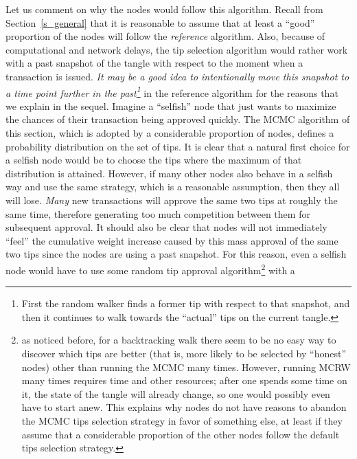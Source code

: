 \documentclass[12pt]{article}
\begin{document}
Let us comment on why 
 the nodes would follow this algorithm.
Recall from Section~\ref{s_general} that
it is reasonable to assume that at least a ``good'' proportion
of the nodes will follow the \emph{reference} algorithm.
Also, because of computational and network delays, the 
tip selection algorithm would rather work with a past snapshot
of the tangle with respect to the moment when a transaction
is issued. \emph{It may be a good idea to intentionally
move this snapshot to a time point further in the past\footnote{First
the random walker finds a former tip with respect to that snapshot,
and then it continues to walk towards the ``actual'' tips
on the current tangle.}} in the reference algorithm 
for the reasons that we explain in the sequel.
Imagine a ``selfish'' node that just wants to maximize 
the chances of their transaction being approved quickly.
The MCMC algorithm of this section, which is adopted by a
 considerable proportion of nodes, 
defines a probability
distribution on the set of tips. 
It is clear that a natural first choice for a selfish node would be
to choose the tips where the maximum of that distribution 
is attained. However, if many other nodes also behave
in a selfish way 
 and use the same strategy, which is a reasonable assumption, 
 then they all 
will lose. \emph{Many} new transactions will approve 
the same two tips at roughly the same time, therefore
generating too much competition between them for subsequent approval.
It should also be clear that nodes will not immediately ``feel'' the cumulative 
weight increase caused by this mass approval of the same two tips since 
the nodes are using a past snapshot.
 For this reason, even a selfish node would have 
to use some random tip approval algorithm\footnote{as noticed
before, for a backtracking walk there 
seem to be no easy way to discover which tips are 
 better (that is, more likely to be selected
by ``honest'' nodes) other than running the MCMC many times.
However, running MCRW many times requires time and other
resources; after one spends some time on it, 
the state of the tangle will already change, 
so one would possibly even have to start anew.
This explains why nodes do not have reasons
to abandon the MCMC tips selection strategy in favor
of something else, at least if they assume that a 
considerable proportion of the other nodes follow
the default tips selection strategy.}
 with a 
\end{document}
